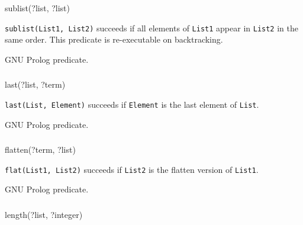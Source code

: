 \begin{TemplatesOneCol}
sublist(?list, ?list)

\end{TemplatesOneCol}

\Description

\texttt{sublist(List1, List2)} succeeds if all elements of \texttt{List1} appear in \texttt{List2} in the same order. This predicate is re-executable on backtracking.

\PlErrorsNone

\Portability

GNU Prolog predicate.

\subsubsection{}

\begin{TemplatesOneCol}
last(?list, ?term)

\end{TemplatesOneCol}

\Description

\texttt{last(List, Element)} succeeds if \texttt{Element} is the last element
of \texttt{List}.

\PlErrorsNone

\Portability

GNU Prolog predicate.

\subsubsection{}

\begin{TemplatesOneCol}
flatten(?term, ?list)

\end{TemplatesOneCol}

\Description

\texttt{flat(List1, List2)} succeeds if \texttt{List2} is the flatten version
of \texttt{List1}.

\PlErrorsNone

\Portability

GNU Prolog predicate.

\subsubsection{}
\label{length/2}

\begin{TemplatesOneCol}
length(?list, ?integer)

\end{TemplatesOneCol}

